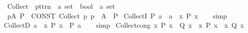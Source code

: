 \begin{isabellebody}
\isamarkupfalse%
\isanewline
\ \ {\isachardoublequoteopen}{\isacharunderscore}{\kern0pt}Collect{\isachardoublequoteclose}\ {\isacharcolon}{\kern0pt}{\isacharcolon}{\kern0pt}\ {\isachardoublequoteopen}pttrn\ {\isasymRightarrow}\ {\isacharprime}{\kern0pt}a\ set\ {\isasymRightarrow}\ bool\ {\isasymRightarrow}\ {\isacharprime}{\kern0pt}a\ set{\isachardoublequoteclose}\ \ {\isacharparenleft}{\kern0pt}{\isachardoublequoteopen}{\isacharparenleft}{\kern0pt}{}{\isacharbraceleft}{\kern0pt}{\isacharparenleft}{\kern0pt}{\isacharunderscore}{\kern0pt}{\isacharslash}{\kern0pt}\ {\isasymin}\ {\isacharunderscore}{\kern0pt}{\isacharparenright}{\kern0pt}{\isachardot}{\kern0pt}{\isacharslash}{\kern0pt}\ {\isacharunderscore}{\kern0pt}{\isacharbraceright}{\kern0pt}{\isacharparenright}{\kern0pt}{\isachardoublequoteclose}{\isacharparenright}{\kern0pt}\isanewline
{}\isamarkupfalse%
\isanewline
\ \ {\isachardoublequoteopen}{\isacharbraceleft}{\kern0pt}p{\isacharcolon}{\kern0pt}A{\isachardot}{\kern0pt}\ P{\isacharbraceright}{\kern0pt}{\isachardoublequoteclose}\ {\isasymrightharpoonup}\ {\isachardoublequoteopen}CONST\ Collect\ {\isacharparenleft}{\kern0pt}{\isasymlambda}p{\isachardot}{\kern0pt}\ p\ {\isasymin}\ A\ {\isasymand}\ P{\isacharparenright}{\kern0pt}{\isachardoublequoteclose}\isanewline
\isanewline
{}\isamarkupfalse%
\ CollectI{\isacharcolon}{\kern0pt}\ {\isachardoublequoteopen}P\ a\ {\isasymLongrightarrow}\ a\ {\isasymin}\ {\isacharbraceleft}{\kern0pt}x{\isachardot}{\kern0pt}\ P\ x{\isacharbraceright}{\kern0pt}{\isachardoublequoteclose}\isanewline
%
\isadelimproof
\ \ %
\endisadelimproof
%
\isatagproof
{}\isamarkupfalse%
\ simp%
\endisatagproof
{\isafoldproof}%
%
\isadelimproof
\isanewline
%
\endisadelimproof
\isanewline
{}\isamarkupfalse%
\ CollectD{\isacharcolon}{\kern0pt}\ {\isachardoublequoteopen}a\ {\isasymin}\ {\isacharbraceleft}{\kern0pt}x{\isachardot}{\kern0pt}\ P\ x{\isacharbraceright}{\kern0pt}\ {\isasymLongrightarrow}\ P\ a{\isachardoublequoteclose}\isanewline
%
\isadelimproof
\ \ %
\endisadelimproof
%
\isatagproof
{}\isamarkupfalse%
\ simp%
\endisatagproof
{\isafoldproof}%
%
\isadelimproof
\isanewline
%
\endisadelimproof
\isanewline
{}\isamarkupfalse%
\ Collect{\isacharunderscore}{\kern0pt}cong{\isacharcolon}{\kern0pt}\ {\isachardoublequoteopen}{\isacharparenleft}{\kern0pt}{\isasymAnd}x{\isachardot}{\kern0pt}\ P\ x\ {\isacharequal}{\kern0pt}\ Q\ x{\isacharparenright}{\kern0pt}\ {\isasymLongrightarrow}\ {\isacharbraceleft}{\kern0pt}x{\isachardot}{\kern0pt}\ P\ x{\isacharbraceright}{\kern0pt}\ {\isacharequal}{\kern0pt}\ {\isacharbraceleft}{\kern0pt}x{\isachardot}{\kern0pt}\ Q\ x{\isacharbraceright}{\kern0pt}{\isachardoublequoteclose}\isanewline

\end{isabellebody}
